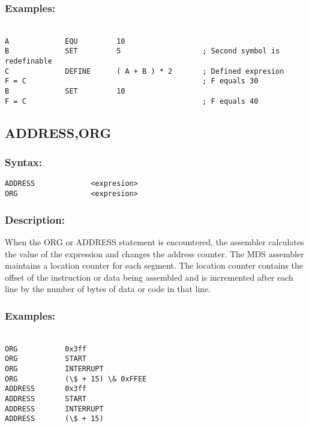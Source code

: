         \subsubsection{Examples:}
        {
            ~\\
            \usecodefont
            \verb'A             EQU         10'\\
            \verb'B             SET         5                   ; Second symbol is redefinable'\\
            \verb'C             DEFINE      ( A + B ) * 2       ; Defined expresion'\\
            \verb'F = C                                         ; F equals 30'\\
            \verb'B             SET         10'\\
            \verb'F = C                                         ; F equals 40'\\
        }

    \subsection{ADDRESS,ORG}
        \subsubsection{Syntax:}
            \verb'ADDRESS             <expresion>'\\
            \verb'ORG                 <expresion>'

        \subsubsection{Description:}
        When the ORG or ADDRESS statement is encountered, the assembler calculates the value of the expression and changes the address counter. The MDS assembler maintains a location counter for each segment. The location counter contains the offset of the instruction or data being assembled and is incremented after each line by the number of bytes of data or code in that line.

        \subsubsection{Examples:}
        {
            ~\\
            \usecodefont
            \verb'ORG           0x3ff'\\
            \verb'ORG           START'\\
            \verb'ORG           INTERRUPT'\\
            \verb'ORG           (\$ + 15) \& 0xFFEE'\\

            \verb'ADDRESS       0x3ff'\\
            \verb'ADDRESS       START'\\
            \verb'ADDRESS       INTERRUPT'\\
            \verb'ADDRESS       (\$ + 15)'\\
        }
